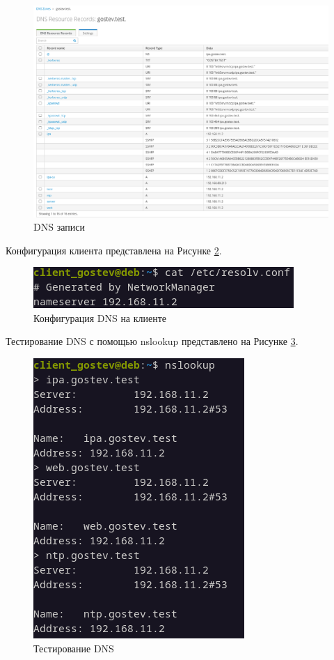 \documentclass[14pt, a4paper]{extarticle}
\numberwithin{equation}{section}
\begin{document}
\begin{figure}[H]
        \centering
        \includegraphics[scale=0.7]{services/dns/dns_records.png}
        \caption{DNS записи}
        \label{fig:dnsrecords}
\end{figure}

Конфигурация клиента представлена на Рисунке \ref{dns_client_setup}.
\begin{figure}[H]
        \centering
        \includegraphics[scale=1.2]{services/dns/client_dns_setup.png}
        \caption{Конфигурация DNS на клиенте}
        \label{dns_client_setup}
\end{figure}

Тестирование DNS с помощью nslookup представлено на Рисунке \ref{fig:nslookup}.
\begin{figure}[H]
        \centering
        \includegraphics[scale=1]{services/dns/nslookup.png}
        \caption{Тестирование DNS}
        \label{fig:nslookup}
\end{figure}
\end{document}

